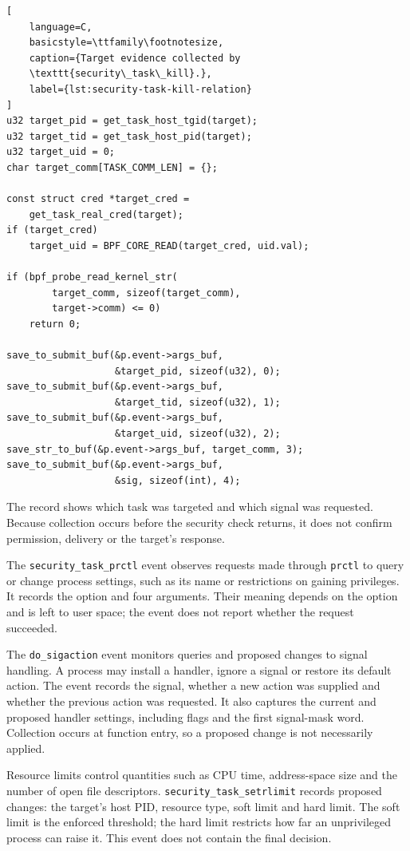 \begin{lstlisting}[
    language=C,
    basicstyle=\ttfamily\footnotesize,
    caption={Target evidence collected by
    \texttt{security\_task\_kill}.},
    label={lst:security-task-kill-relation}
]
u32 target_pid = get_task_host_tgid(target);
u32 target_tid = get_task_host_pid(target);
u32 target_uid = 0;
char target_comm[TASK_COMM_LEN] = {};

const struct cred *target_cred =
    get_task_real_cred(target);
if (target_cred)
    target_uid = BPF_CORE_READ(target_cred, uid.val);

if (bpf_probe_read_kernel_str(
        target_comm, sizeof(target_comm),
        target->comm) <= 0)
    return 0;

save_to_submit_buf(&p.event->args_buf,
                   &target_pid, sizeof(u32), 0);
save_to_submit_buf(&p.event->args_buf,
                   &target_tid, sizeof(u32), 1);
save_to_submit_buf(&p.event->args_buf,
                   &target_uid, sizeof(u32), 2);
save_str_to_buf(&p.event->args_buf, target_comm, 3);
save_to_submit_buf(&p.event->args_buf,
                   &sig, sizeof(int), 4);
\end{lstlisting}

The record shows which task was targeted and which signal was requested.
Because collection occurs before the security check returns, it does not
confirm permission, delivery or the target's response.

The \texttt{security\_task\_prctl} event observes requests made through
\texttt{prctl} to query or change process settings, such as its name or
restrictions on gaining privileges. It records the option and four
arguments. Their meaning depends on the option and is left to user space;
the event does not report whether the request succeeded.

The \texttt{do\_sigaction} event monitors queries and proposed changes to
signal handling. A process may install a handler, ignore a signal or
restore its default action. The event records the signal, whether a new
action was supplied and whether the previous action was requested. It
also captures the current and proposed handler settings, including flags
and the first signal-mask word. Collection occurs at function entry,
so a proposed change is not necessarily applied.

Resource limits control quantities such as CPU time, address-space size
and the number of open file descriptors.
\texttt{security\_task\_setrlimit} records proposed changes: the target's
host PID, resource type, soft limit and hard limit. The soft limit is
the enforced threshold; the hard limit restricts how far an unprivileged
process can raise it. This event does not contain the final decision.

